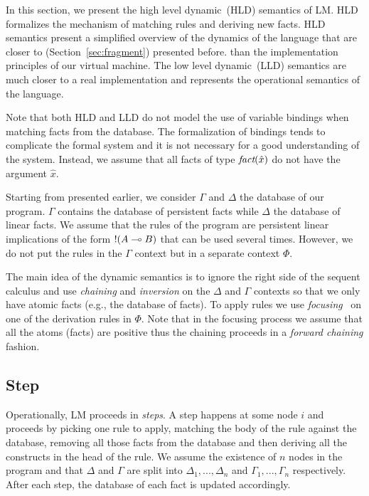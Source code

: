 
In this section, we present the high level dynamic~(HLD) semantics of LM.  HLD
formalizes the mechanism of matching rules and deriving new facts.  HLD
semantics present a simplified overview of the dynamics of the language that are
closer to \fragment (Section~\ref{sec:fragment}) presented before.  than the
implementation principles of our virtual machine. The low level dynamic~(LLD)
semantics are much closer to a real implementation and represents the
operational semantics of the language.

Note that both HLD and LLD do not model the use of variable bindings when
matching facts from the database. The formalization of bindings tends to
complicate the formal system and it is not necessary for a good understanding of
the system. Instead, we assume that all facts of type $\emph{fact}(\hat{x})$ do
not have the argument $\hat{x}$.

Starting from \fragment presented earlier, we consider $\Gamma$ and $\Delta$ the database
of our program. $\Gamma$ contains the database of persistent facts while $\Delta$ the database of linear
facts. We assume that the rules of the program are persistent linear implications of the form
${!} (A \multimap B)$ that can be used several times. However, we do not put the rules in the $\Gamma$
context but in a separate context $\Phi$.

The main idea of the dynamic semantics is to ignore the right side of the
sequent calculus and use \emph{chaining} and \emph{inversion} on the $\Delta$
and $\Gamma$ contexts so that we only have atomic facts (e.g., the database of
facts).  To apply rules we use
\emph{focusing}~\cite{Andreoli92logicprogramming} on one of the derivation rules
in $\Phi$. Note that in the focusing process we assume that all the atoms
(facts) are positive thus the chaining proceeds in a \emph{forward chaining}
fashion.

\subsection{Step}\label{sec:step_hld}

Operationally, LM proceeds in \emph{steps}. A step happens at some node $i$ and
proceeds by picking one rule to apply, matching the body of the rule against the
database, removing all those facts from the database and then deriving all the
constructs in the head of the rule. We assume the existence of $n$ nodes in the
program and that $\Delta$ and $\Gamma$ are split into $\Delta_1, ..., \Delta_n$
and $\Gamma_1, ..., \Gamma_n$ respectively. After each step, the database of
each fact is updated accordingly.


